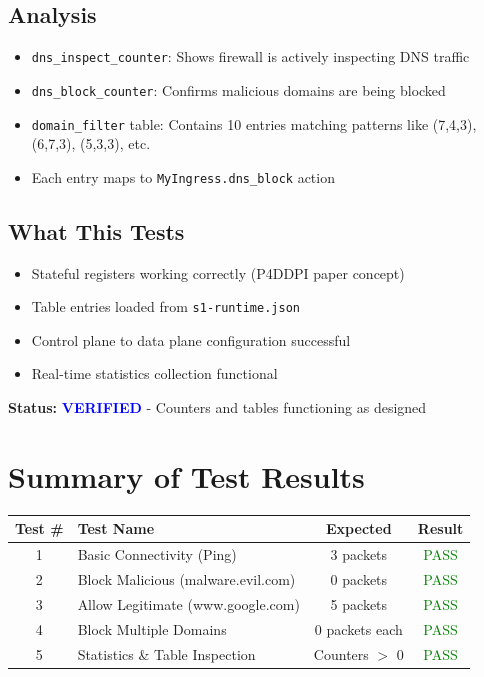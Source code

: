 \documentclass[11pt,a4paper]{article}
\begin{document}
\subsection*{Analysis}
\begin{itemize}
\item \texttt{dns\_inspect\_counter}: Shows firewall is actively inspecting DNS traffic
\item \texttt{dns\_block\_counter}: Confirms malicious domains are being blocked
\item \texttt{domain\_filter} table: Contains 10 entries matching patterns like (7,4,3), (6,7,3), (5,3,3), etc.
\item Each entry maps to \texttt{MyIngress.dns\_block} action
\end{itemize}

\subsection*{What This Tests}
\begin{itemize}
\item Stateful registers working correctly (P4DDPI paper concept)
\item Table entries loaded from \texttt{s1-runtime.json}
\item Control plane to data plane configuration successful
\item Real-time statistics collection functional
\end{itemize}

\begin{tcolorbox}[colback=blue!10,colframe=blue!50]
\textbf{Status:} \textcolor{blue}{\textbf{VERIFIED}} - Counters and tables functioning as designed
\end{tcolorbox}

\newpage

\section*{Summary of Test Results}

\begin{center}
\begin{tabular}{@{}clcc@{}}
\toprule
\textbf{Test \#} & \textbf{Test Name} & \textbf{Expected} & \textbf{Result} \\
\midrule
1 & Basic Connectivity (Ping) & 3 packets & \textcolor{green}{PASS} \\
2 & Block Malicious (malware.evil.com) & 0 packets & \textcolor{green}{PASS} \\
3 & Allow Legitimate (www.google.com) & 5 packets & \textcolor{green}{PASS} \\
4 & Block Multiple Domains & 0 packets each & \textcolor{green}{PASS} \\
5 & Statistics \& Table Inspection & Counters $>$ 0 & \textcolor{green}{PASS} \\
\bottomrule
\end{tabular}
\end{center}
\end{document}

